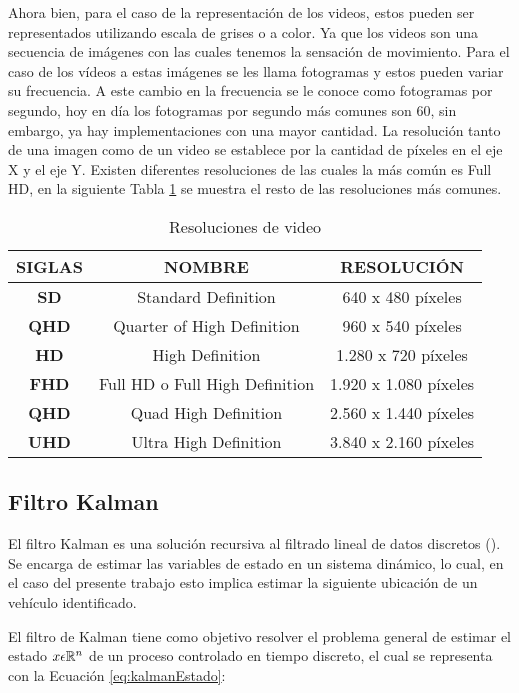 Ahora bien, para el caso de la representación de los videos, estos pueden ser representados utilizando escala de grises o a color. Ya que los videos son una secuencia de imágenes con las cuales tenemos la sensación de movimiento. Para el caso de los vídeos a estas imágenes se les llama fotogramas y estos pueden variar su frecuencia. A este cambio en la frecuencia se le conoce como fotogramas por segundo, hoy en día los fotogramas por segundo más comunes son 60, sin embargo, ya hay implementaciones con una mayor cantidad.
La resolución tanto de una imagen como de un video se establece por la cantidad de píxeles en el eje X y el eje Y. Existen diferentes resoluciones de las cuales la más común es Full HD, en la siguiente Tabla \ref{tab:resolutions} se muestra el resto de las resoluciones más comunes.

\begin{table}[H]
    \caption{Resoluciones de video}
    \centering
    \label{tab:resolutions}
    \begin{tabular}{|c|c|c|}
    \hline
    \textbf{SIGLAS} & \textbf{NOMBRE} & \textbf{RESOLUCIÓN} \\ \hline
    \textbf{SD}     & Standard Definition & 640 x 480 píxeles \\ \hline
    \textbf{QHD}    & Quarter of High Definition & 960 x 540 píxeles \\ \hline
    \textbf{HD}     & High Definition & 1.280 x 720 píxeles \\ \hline
    \textbf{FHD}    & Full HD o Full High Definition & 1.920 x 1.080 píxeles \\ \hline
    \textbf{QHD}    & Quad High Definition & 2.560 x 1.440 píxeles \\ \hline
    \textbf{UHD}    & Ultra High Definition & 3.840 x 2.160 píxeles \\ \hline
    \end{tabular}
\end{table}

\subsection{Filtro Kalman}

El filtro Kalman es una solución recursiva al filtrado lineal de datos discretos (\cite{welch1995introduction}). Se encarga de estimar las variables de estado en un sistema dinámico, lo cual, en el caso del presente trabajo esto implica estimar la siguiente ubicación de un vehículo identificado.

El filtro de Kalman tiene como objetivo resolver el problema general de estimar el estado $x \space \epsilon \space \mathbb{R} ^{n}$ de un proceso controlado en tiempo discreto, el cual se representa con la Ecuación \ref{eq:kalmanEstado}:

